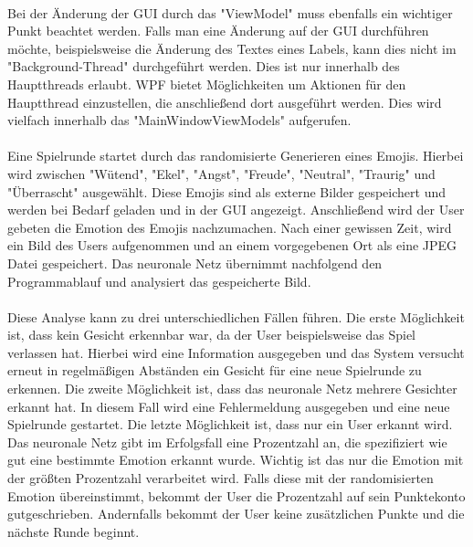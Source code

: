 \documentclass[12pt,a4paper,headinclude,twoside, plainheadsepline, open=right,numbers=noenddot]{scrreprt}
\begin{document}
\paragraph{}
Bei der Änderung der GUI durch das "{}ViewModel"{} muss ebenfalls ein wichtiger Punkt beachtet werden. Falls man eine Änderung auf der GUI durchführen möchte, beispielsweise die Änderung des Textes eines Labels, kann dies nicht im "{}Background-Thread"{} durchgeführt werden. Dies ist nur innerhalb des Hauptthreads erlaubt. WPF bietet Möglichkeiten um Aktionen für den Hauptthread einzustellen, die anschließend dort ausgeführt werden. Dies wird vielfach innerhalb das "{}MainWindowViewModels"{} aufgerufen.
\paragraph{}
Eine Spielrunde startet durch das randomisierte Generieren eines Emojis. Hierbei wird zwischen "{}Wütend"{}, "{}Ekel"{}, "{}Angst"{}, "{}Freude"{}, "{}Neutral"{}, "{}Traurig"{} und "{}Überrascht"{} ausgewählt. Diese Emojis sind als externe Bilder gespeichert und werden bei Bedarf geladen und in der GUI angezeigt. Anschließend wird der User gebeten die Emotion des Emojis nachzumachen. Nach einer gewissen Zeit, wird ein Bild des Users aufgenommen und an einem vorgegebenen Ort als eine JPEG Datei gespeichert. Das neuronale Netz übernimmt nachfolgend den Programmablauf und analysiert das gespeicherte Bild.
\paragraph{}
Diese Analyse kann zu drei unterschiedlichen Fällen führen. Die erste Möglichkeit ist, dass kein Gesicht erkennbar war, da der User beispielsweise das Spiel verlassen hat. Hierbei wird eine Information ausgegeben und das System versucht erneut in regelmäßigen Abständen ein Gesicht für eine neue Spielrunde zu erkennen. Die zweite Möglichkeit ist, dass das neuronale Netz mehrere Gesichter erkannt hat. In diesem Fall wird eine Fehlermeldung ausgegeben und eine neue Spielrunde gestartet. Die letzte Möglichkeit ist, dass nur ein User erkannt wird. Das neuronale Netz gibt im Erfolgsfall eine Prozentzahl an, die spezifiziert wie gut eine bestimmte Emotion erkannt wurde. Wichtig ist das nur die Emotion mit der größten Prozentzahl verarbeitet wird. Falls diese mit der randomisierten Emotion übereinstimmt, bekommt der User die Prozentzahl auf sein Punktekonto gutgeschrieben. Andernfalls bekommt der User keine zusätzlichen Punkte und die nächste Runde beginnt.
\end{document}
